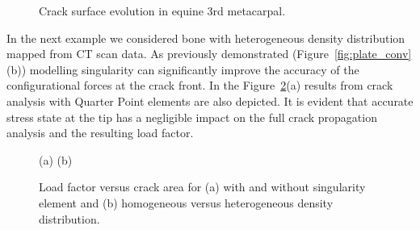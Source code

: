 \documentclass[onecolumn]{svjour3}
\begin{document}
\begin{figure}[h!]
	\centering
	\begin{centering}
	\end{centering}		
		\caption{Crack surface evolution in equine 3rd metacarpal.}
		\label{fig:crack_snapshots}
\end{figure}
% 
% 
In the next example we considered bone with heterogeneous density distribution mapped from CT scan data. 
As previously demonstrated (Figure~\ref{fig:plate_conv}(b)) modelling singularity can significantly improve the accuracy of the configurational forces at the crack front. In the Figure~\ref{fig:load_factor1}(a) results from crack analysis with Quarter Point elements are also depicted. It is evident that accurate stress state at the tip has a negligible impact on the full crack propagation analysis and the resulting load factor.  
% 
\begin{figure}[h]
	\centering
	\begin{minipage}{.45\textwidth}
\end{minipage}%
\quad
\begin{minipage}{.45\textwidth}
\end{minipage}
% 
(a) \hspace{5cm} (b)
	\caption{Load factor versus crack area for (a) with and without singularity element and (b) homogeneous versus heterogeneous density distribution.}
	\label{fig:load_factor1}
\end{figure}
\end{document}
